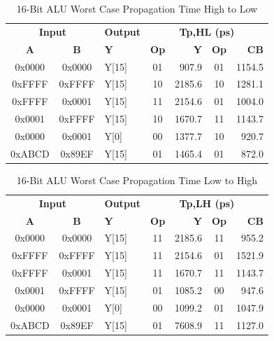 \documentclass[11pt]{article}
\begin{document}
		
			\begin{table}[H]
				\centering
				\caption{16-Bit ALU Worst Case Propagation Time High to Low}
				\label{tab:ALU-16-Bit-Tpd-HL}
				\begin{tabular}{|cclcrcr|}
					\hline
					\multicolumn{2}{|c}{\textbf{Input}} & \textbf{Output} & \multicolumn{4}{c|}{\textbf{Tp,HL (ps)}} \\
					\textbf{A} & \textbf{B} & \textbf{Y} & \textbf{Op} & \textbf{Y} & \textbf{Op} & \textbf{CB} \\
					\hline
					0x0000 & 0x0000 & Y{[}15{]} & 01 & 907.9 & 01 & 1154.5 \\
					0xFFFF & 0xFFFF & Y{[}15{]} & 10 & 2185.6 & 10 & 1281.1 \\
					0xFFFF & 0x0001 & Y{[}15{]} & 11 & 2154.6 & 01 & 1004.0 \\
					0x0001 & 0xFFFF & Y{[}15{]} & 10 & 1670.7 & 11 & 1143.7 \\
					0x0000 & 0x0001 & Y{[}0{]} & 00 & 1377.7 & 10 & 920.7 \\
					0xABCD & 0x89EF & Y{[}15{]} & 01 & 1465.4 & 01 & 872.0 \\
					\hline
				\end{tabular}
			\end{table}
		
		
			\begin{table}[H]
				\centering
				\caption{16-Bit ALU Worst Case Propagation Time Low to High}
				\label{tab:ALU-16-Bit-Tpd-LH}
				\begin{tabular}{|cclcrcr|}
					\hline
					\multicolumn{2}{|c}{\textbf{Input}} & \textbf{Output} & \multicolumn{4}{c|}{\textbf{Tp,LH (ps)}} \\
					\textbf{A} & \textbf{B} & \textbf{Y} & \textbf{Op} & \textbf{Y} & \textbf{Op} & \textbf{CB} \\
					\hline
					0x0000 & 0x0000 & Y{[}15{]} & 11 & 2185.6 & 11 & 955.2 \\
					0xFFFF & 0xFFFF & Y{[}15{]} & 11 & 2154.6 & 01 & 1521.9 \\
					0xFFFF & 0x0001 & Y{[}15{]} & 11 & 1670.7 & 11 & 1143.7 \\
					0x0001 & 0xFFFF & Y{[}15{]} & 01 & 1085.2 & 00 & 947.6 \\
					0x0000 & 0x0001 & Y{[}0{]} & 00 & 1099.2 & 01 & 1047.9 \\
					0xABCD & 0x89EF & Y{[}15{]} & 01 & 7608.9 & 11 & 1127.0 \\
					\hline
				\end{tabular}
			\end{table}
		
\end{document}
